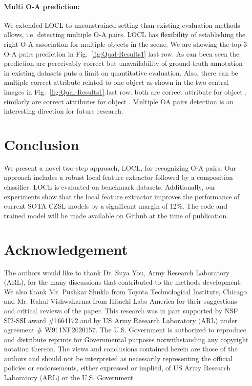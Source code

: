 \documentclass{bmvc2k}
\begin{document}
\paragraph{Multi O-A prediction:}
We extended LOCL to unconstrained setting than existing evaluation methods allows, i.e. detecting multiple O-A pairs. LOCL has flexibility of establishing the right O-A association for multiple objects in the scene. We are showing the top-3 O-A pairs prediction in Fig.~\ref{fig:Qual-Results1} last row. As can been seen the prediction are perceivably correct but unavailability of ground-truth annotation in existing datasets puts a limit on quantitative evaluation. Also, there can be multiple correct attribute related to one object as shown in the two central images in Fig.~\ref{fig:Qual-Results1} last row.  both are correct attribute for object , similarly  are correct attributes for object . Multiple OA pairs detection is an interesting direction for future research.
 \vspace{-0.45cm}
\section{Conclusion}
\vspace{-0.2cm}
We present a novel two-step approach, LOCL, for recognizing O-A pairs. Our approach includes a robust local feature extractor followed by a composition classifier.
LOCL is evaluated on benchmark datasets. Additionally, our experiments show that the local feature extractor improves the performance of current SOTA CZSL models by a significant margin of 12\%. The code and trained model will be made available on Github at the time of publication.  












\section{Acknowledgement}
\vspace{-0.2cm}
The authors would like to thank Dr. Suya You, Army Research Laboratory (ARL), for the many discussions that contributed to the methods development. We also thank Mr. Pushkar Shukla from Toyota Technological Institute, Chicago and Mr. Rahul Vishwakarma from Hitachi Labs America for their suggestions and critical reviews of the paper. This research was in part supported by NSF SI2-SSI award \#1664172 and  by US Army Research Laboratory (ARL) under agreement \# W911NF2020157. The U.S. Government is authorized to reproduce and distribute reprints for Governmental purposes notwithstanding any copyright notation thereon. The views and conclusions contained herein are those of the authors and should not be interpreted as necessarily representing the official policies or endorsements, either expressed or implied, of US Army Research Laboratory (ARL) or the U.S. Government 
\end{document}
